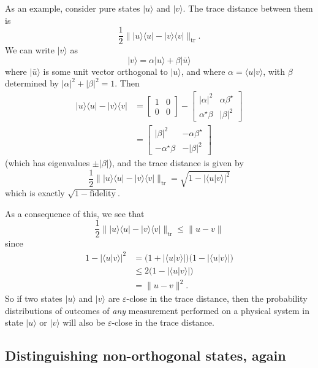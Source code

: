 \documentclass[fleqn]{article}
\begin{document}
As an example, consider pure states \(|u\rangle\) and \(|v\rangle\).
The trace distance between them is
\[
  \frac{1}{2}\||u\rangle\langle u|-|v\rangle\langle v|\|_{\operatorname{tr}}.
\]
We can write \(|v\rangle\) as
\[
  |v\rangle = \alpha|u\rangle + \beta|\bar{u}\rangle
\]
where \(|\bar{u}\rangle\) is some unit vector orthogonal to \(|u\rangle\), and where \(\alpha=\langle u|v\rangle\), with \(\beta\) determined by \(|\alpha|^2+|\beta|^2=1\).
Then
\[
  \begin{aligned}
    |u\rangle\langle u| - |v\rangle\langle v|
    &= \begin{bmatrix}1&0\\0&0\end{bmatrix} - \begin{bmatrix}|\alpha|^2&\alpha\beta^\star\\\alpha^\star\beta&|\beta|^2\end{bmatrix}
  \\&= \begin{bmatrix}|\beta|^2&-\alpha\beta^\star\\-\alpha^\star\beta&-|\beta|^2\end{bmatrix}
  \end{aligned}
\]
(which has eigenvalues \(\pm|\beta|\)), and the trace distance is given by
\[
  \frac{1}{2}\||u\rangle\langle u|-|v\rangle\langle v|\|_{\operatorname{tr}} = \sqrt{1-|\langle u|v\rangle|^2}
\]
which is exactly \(\sqrt{1-\text{fidelity}}\).

As a consequence of this, we see that
\[
  \frac{1}{2}\||u\rangle\langle u|-|v\rangle\langle v|\|_{\operatorname{tr}}
  \leqslant\|u-v\|
\]
since
\[
  \begin{aligned}
    1 - |\langle u|v\rangle|^2
    &= \Big( 1+|\langle u|v\rangle| \Big) \Big( 1-|\langle u|v\rangle| \Big)
  \\&\leqslant 2\Big( 1-|\langle u|v\rangle| \Big)
  \\&= \|u-v\|^2.
  \end{aligned}
\]
So if two states \(|u\rangle\) and \(|v\rangle\) are \(\varepsilon\)-close in the trace distance, then the probability distributions of outcomes of \emph{any} measurement performed on a physical system in state \(|u\rangle\) or \(|v\rangle\) will also be \(\varepsilon\)-close in the trace distance.

\hypertarget{distinguishing-non-orthogonal-states-again}{%
\subsection{Distinguishing non-orthogonal states, again}\label{distinguishing-non-orthogonal-states-again}}
\end{document}

